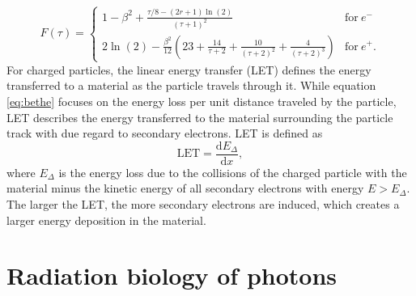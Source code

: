 \begin{equation}
F(\tau) = \begin{cases}
1 - \beta^2 + \frac{\tau/8 - (2r+1)\ln(2)}{(\tau + 1)^2} & \mathrm{for}~e^-\,\\
2\ln(2) - \frac{\beta^2}{12}\left(23 + \frac{14}{\tau + 2} + \frac{10}{(\tau + 2)^2} + \frac{4}{(\tau + 2)^3}\right)& \mathrm{for }~e^+.
\end{cases}
\end{equation}
For charged particles, the linear energy transfer (LET) defines the energy transferred to a material as the particle travels through it. While equation \ref{eq:bethe} focuses on the energy loss per unit distance traveled by the particle, LET describes the energy transferred to the material surrounding the particle track with due regard to secondary electrons. LET is defined as
\begin{equation}
\mathrm{LET} = \frac{\mathrm{d}E_\Delta}{\mathrm{d}x},
\end{equation}
where $E_\Delta$ is the energy loss due to the collisions of the charged particle with the material minus the kinetic energy of all secondary electrons with energy $E>E_\Delta$. The larger the LET, the more secondary electrons are induced, which creates a larger energy deposition in the material.
\section{Radiation biology of photons}
